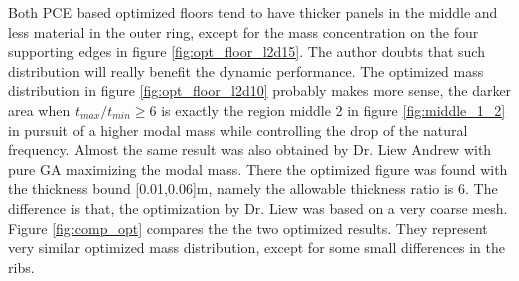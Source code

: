 Both PCE based optimized floors tend to have thicker panels in the middle and less material in the outer ring, except for the mass concentration on the four supporting edges in figure \ref{fig:opt_floor_l2d15}. The author doubts that such distribution will really benefit the dynamic performance. The optimized mass distribution in figure \ref{fig:opt_floor_l2d10} probably makes more sense, the darker area when $t_{max}/t_{min}\geq 6$ is exactly the region middle 2 in figure \ref{fig:middle_1_2} in pursuit of a higher modal mass while controlling the drop of the natural frequency. Almost the same result was also obtained by Dr. Liew Andrew with pure GA maximizing the modal mass. There the optimized figure was found with the thickness bound [0.01,0.06]m, namely the allowable thickness ratio is 6. The difference is that, the optimization by Dr. Liew was based on a very coarse mesh. Figure \ref{fig:comp_opt} compares the the two optimized results. They represent very similar optimized mass distribution, except for some small differences in the ribs.

